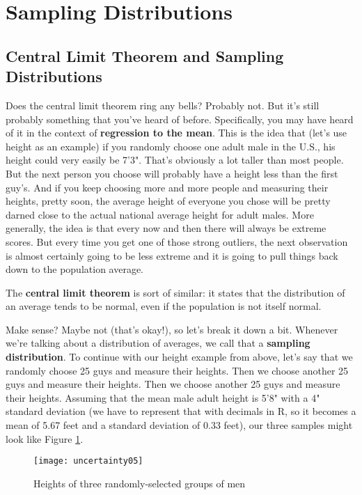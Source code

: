 \section{Sampling Distributions}

\subsection{Central Limit Theorem and Sampling Distributions}
Does the central limit theorem ring any bells? Probably not. But it's still probably something that you've heard of before. Specifically, you may have heard of it in the context of \textbf{regression to the mean}. This is the idea that (let's use height as an example) if you randomly choose one adult male in the U.S., his height could very easily be 7'3". That's obviously a lot taller than most people. But the next person you choose will probably have a height less than the first guy's. And if you keep choosing more and more people and measuring their heights, pretty soon, the average height of everyone you chose will be pretty darned close to the actual national average height for adult males. More generally, the idea is that every now and then there will always be extreme scores. But every time you get one of those strong outliers, the next observation is almost certainly going to be less extreme and it is going to pull things back down to the population average.

The \textbf{central limit theorem} is sort of similar: it states that the distribution of an average tends to be normal, even if the population is not itself normal.

Make sense? Maybe not (that's okay!), so let's break it down a bit. Whenever we're talking about a distribution of averages, we call that a \textbf{sampling distribution}. To continue with our height example from above, let's say that we randomly choose 25 guys and measure their heights. Then we choose another 25 guys and measure their heights. Then we choose another 25 guys and measure their heights. Assuming that the mean male adult height is 5'8" with a 4" standard deviation (we have to represent that with decimals in R, so it becomes a mean of 5.67 feet and a standard deviation of 0.33 feet), our three samples might look like Figure \ref{fig:uncertainty05}.

\begin{figure}[h]
\texttt{[image: uncertainty05]}
\caption{Heights of three randomly-selected groups of men}
\label{fig:uncertainty05}
\end{figure}

